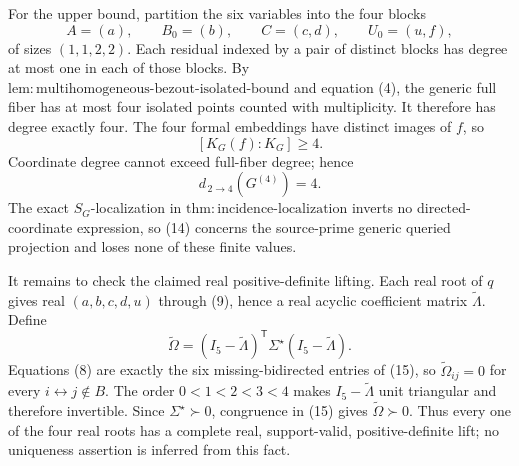 For the upper bound, partition the six variables into the four blocks
\[
 A=(a),\qquad B_0=(b),\qquad C=(c,d),\qquad U_0=(u,f),
\]
of sizes \((1,1,2,2)\). Each residual indexed by a pair of distinct blocks has degree at most one in each of those blocks. By \(\mathrm{lem:multihomogeneous\mbox{-}bezout\mbox{-}isolated\mbox{-}bound}\) and equation (4), the generic full fiber has at most four isolated points counted with multiplicity. It therefore has degree exactly four. The four formal embeddings have distinct images of \(f\), so
\[
 [K_G(f):K_G]\geq4.
\]
Coordinate degree cannot exceed full-fiber degree; hence
\[
 d_{\,2\to4}(G^{(4)})=4.
 \tag{14}
\]
The exact \(S_G\)-localization in \(\mathrm{thm:incidence\mbox{-}localization}\) inverts no directed-coordinate expression, so (14) concerns the source-prime generic queried projection and loses none of these finite values.

It remains to check the claimed real positive-definite lifting. Each real root of \(q\) gives real \((a,b,c,d,u)\) through (9), hence a real acyclic coefficient matrix \(\widetilde\Lambda\). Define
\[
 \widetilde\Omega=(I_5-\widetilde\Lambda)^{\mathsf T}
 \Sigma^{\star}(I_5-\widetilde\Lambda).
 \tag{15}
\]
Equations (8) are exactly the six missing-bidirected entries of (15), so \(\widetilde\Omega_{ij}=0\) for every \(i\leftrightarrow j\notin B\). The order \(0<1<2<3<4\) makes \(I_5-\widetilde\Lambda\) unit triangular and therefore invertible. Since \(\Sigma^{\star}\succ0\), congruence in (15) gives \(\widetilde\Omega\succ0\). Thus every one of the four real roots has a complete real, support-valid, positive-definite lift; no uniqueness assertion is inferred from this fact.

